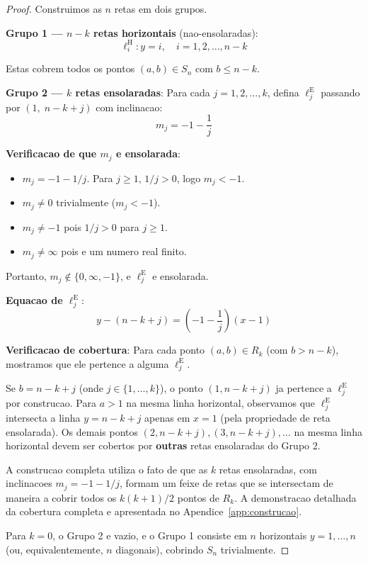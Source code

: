 \documentclass[5p]{elsarticle}
\theoremstyle{definition}
\begin{document}
\begin{proof}
  Construimos as $n$ retas em dois grupos.

  \textbf{Grupo 1 — $n-k$ retas horizontais} (nao-ensolaradas):
  \begin{equation}
    \ell_i^{\text{H}}: y = i, \quad i = 1, 2, \dots, n-k
  \end{equation}

  Estas cobrem todos os pontos $(a,b) \in S_n$ com $b \leq n-k$.

  \textbf{Grupo 2 — $k$ retas ensolaradas}:
  Para cada $j = 1, 2, \dots, k$, defina $\ell_j^{\text{E}}$ passando por
  $(1, \; n-k+j)$ com inclinacao:
  \begin{equation}\label{eq:mj}
    m_j = -1 - \frac{1}{j}
  \end{equation}

  \textbf{Verificacao de que $m_j$ e ensolarada}:
  \begin{itemize}
    \item $m_j = -1 - 1/j$. Para $j \geq 1$, $1/j > 0$, logo $m_j < -1$.
    \item $m_j \neq 0$ trivialmente ($m_j < -1$).
    \item $m_j \neq -1$ pois $1/j > 0$ para $j \geq 1$.
    \item $m_j \neq \infty$ pois e um numero real finito.
  \end{itemize}
  Portanto, $m_j \notin \{0, \infty, -1\}$, e $\ell_j^{\text{E}}$ e ensolarada.

  \textbf{Equacao de $\ell_j^{\text{E}}$}:
  \begin{equation}
    y - (n-k+j) = \left(-1 - \frac{1}{j}\right)(x-1)
  \end{equation}

  \textbf{Verificacao de cobertura}: Para cada ponto $(a,b) \in R_k$ (com $b > n-k$),
  mostramos que ele pertence a alguma $\ell_j^{\text{E}}$.

  Se $b = n-k+j$ (onde $j \in \{1,\dots,k\}$), o ponto $(1, n-k+j)$ ja pertence
  a $\ell_j^{\text{E}}$ por construcao. Para $a > 1$ na mesma linha horizontal,
  observamos que $\ell_j^{\text{E}}$ intersecta a linha $y = n-k+j$ apenas em $x=1$
  (pela propriedade de reta ensolarada). Os demais pontos $(2, n-k+j), (3, n-k+j),
  \dots$ na mesma linha horizontal devem ser cobertos por \textbf{outras} retas
  ensolaradas do Grupo 2.

  A construcao completa utiliza o fato de que as $k$ retas ensolaradas, com
  inclinacoes $m_j = -1-1/j$, formam um feixe de retas que se intersectam de
  maneira a cobrir todos os $k(k+1)/2$ pontos de $R_k$. A demonstracao detalhada
  da cobertura completa e apresentada no Apendice~\ref{app:construcao}.

  Para $k = 0$, o Grupo 2 e vazio, e o Grupo 1 consiste em $n$ horizontais
  $y = 1, \dots, n$ (ou, equivalentemente, $n$ diagonais), cobrindo $S_n$
  trivialmente.
\end{proof}
\end{document}
